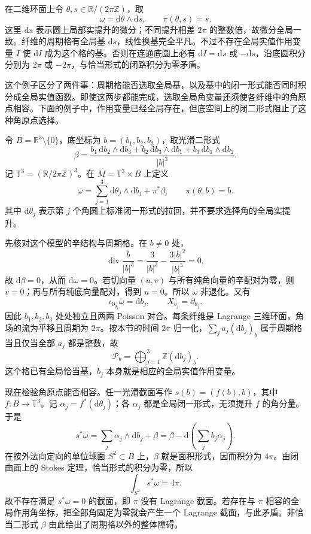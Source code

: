 \begin{example}\label{g4:exm:1103:affine-circle}
	在二维环面上令 \(\theta,s\in\mathbb R/(2\pi\mathbb Z)\)，取
	\[
		\omega=\mathrm{d}\theta\wedge\mathrm{d}s,\qquad \pi(\theta,s)=s.
	\]
	这里 \(\mathrm{d}s\) 表示圆上局部实提升的微分；不同提升相差 \(2\pi\) 的整数倍，故微分全局一致。纤维的周期格有全局基 \(\mathrm{d}s\)，线性换基完全平凡。不过不存在全局实值作用变量 \(I\) 使 \(\mathrm{d}I\) 成为这个格的基。否则在连通底圆上必有 \(\mathrm{d}I=\mathrm{d}s\) 或 \(-\mathrm{d}s\)，沿底圆积分分别为 \(2\pi\) 或 \(-2\pi\)，与恰当形式的闭路积分为零矛盾。
\end{example}

这个例子区分了两件事：周期格能否选取全局基，以及基中的闭一形式能否同时积分成全局实值函数。即使这两步都能完成，选取全局角变量还须使各纤维中的角原点相容。下面的例子中，作用变量已经全局存在，但底空间上的闭二形式阻止了这种角原点选择。

\begin{example}\label{g4:exm:1103:magnetic-obstruction}
	令 \(B=\mathbb R^3\setminus\{0\}\)，底坐标为 \(b=(b_1,b_2,b_3)\)，取光滑二形式
	\[
		\beta=\frac{b_1\,\mathrm{d}b_2\wedge\mathrm{d}b_3+
		b_2\,\mathrm{d}b_3\wedge\mathrm{d}b_1+
		b_3\,\mathrm{d}b_1\wedge\mathrm{d}b_2}{|b|^3}.
	\]
	记 \(\mathbb T^3=(\mathbb R/2\pi\mathbb Z)^3\)。在 \(M=\mathbb T^3\times B\) 上定义
	\[
		\omega=\sum_{j=1}^3\mathrm{d}\theta_j\wedge\mathrm{d}b_j+\pi^*\beta,
		\qquad \pi(\theta,b)=b.
	\]
	其中 \(\mathrm{d}\theta_j\) 表示第 \(j\) 个角圆上标准闭一形式的拉回，并不要求选择角的全局实提升。

	先核对这个模型的辛结构与周期格。在 \(b\ne0\) 处，
	\[
		\operatorname{div}\frac b{|b|^3}
		=\frac3{|b|^3}-\frac{3|b|^2}{|b|^5}=0,
	\]
	故 \(\mathrm{d}\beta=0\)，从而 \(\mathrm{d}\omega=0\)。若切向量 \((u,v)\) 与所有纯角向量的辛配对为零，则 \(v=0\)；再与所有纯底向量配对，得到 \(u=0\)。所以 \(\omega\) 非退化。又有
	\[
		\iota_{\partial_{\theta_j}}\omega=\mathrm{d}b_j,
		\qquad X_{b_j}=\partial_{\theta_j}.
	\]
	因此 \(b_1,b_2,b_3\) 处处独立且两两 Poisson 对合。每条纤维是 Lagrange 三维环面，角场的流为平移且周期为 \(2\pi\)。按本节的时间 \(2\pi\) 归一化，\(\sum_j a_j(\mathrm{d}b_j)_b\) 属于周期格当且仅当全部 \(a_j\) 都是整数，故
	\[
		\mathcal P_b=\bigoplus_{j=1}^3\mathbb Z(\mathrm{d}b_j)_b.
	\]
	这个格已有全局恰当基，\(b_j\) 本身就是相应的全局实值作用变量。

	现在检验角原点能否相容。任一光滑截面写作 \(s(b)=(f(b),b)\)，其中 \(f:B\to\mathbb T^3\)。记 \(\alpha_j=f^*(\mathrm{d}\theta_j)\)；各 \(\alpha_j\) 都是全局闭一形式，无须提升 \(f\) 的角分量。于是
	\[
		s^*\omega=\sum_j\alpha_j\wedge\mathrm{d}b_j+\beta
		=\beta-\mathrm{d}\!\left(\sum_jb_j\alpha_j\right).
	\]
	在按外法向定向的单位球面 \(S^2\subset B\) 上，\(\beta\) 就是面积形式，因而积分为 \(4\pi\)。由闭曲面上的 Stokes 定理，恰当形式的积分为零，所以
	\[
		\int_{S^2}s^*\omega=4\pi.
	\]
	故不存在满足 \(s^*\omega=0\) 的截面，即 \(\pi\) 没有 Lagrange 截面。若存在与 \(\pi\) 相容的全局作用角坐标，把全部角固定为零就会产生一个 Lagrange 截面，与此矛盾。非恰当二形式 \(\beta\) 由此给出了周期格以外的整体障碍。
\end{example}

